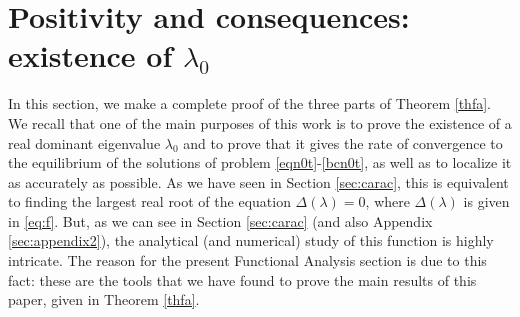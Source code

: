 \documentclass[a4paper]{article}
\numberwithin{equation}{section}
\begin{document}

%
%

%
\section{Positivity and consequences: existence of $\lambda_0$}\label{posit}
In this section, we make a complete proof of the three parts of Theorem \ref{thfa}. We recall that one of the main purposes of this work is to prove the existence of a real dominant eigenvalue $\lambda_0$ and to prove that it gives the rate of convergence to the equilibrium of the solutions of problem \eqref{eqn0t}-\eqref{bcn0t}, as well as to localize it as accurately as possible. As we have seen in Section \ref{sec:carac}, this is equivalent to finding the largest real root of the equation  $\Delta(\lambda)=0$, where $\Delta(\lambda)$ is given in \eqref{eq:f}. But, as we can see in Section \ref{sec:carac} (and also Appendix \ref{sec:appendix2}), the analytical (and numerical) study of this function is highly intricate. The reason for the present Functional Analysis section is due to this fact: these are the tools that we have found to prove the main results of this paper, given in Theorem \ref{thfa}.
\end{document}
